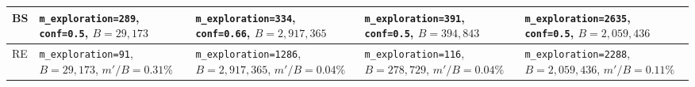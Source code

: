 \begin{table}[ht]
\begin{tabular}{lllll}
\midrule
BS
& \makecell{\texttt{m\_exploration=289}, \\ \texttt{conf=0.5}, \\ {\scriptsize $B=29{,}173$}}
& \makecell{\texttt{m\_exploration=334}, \\ \texttt{conf=0.66}, \\ {\scriptsize $B=2{,}917{,}365$}}
& \makecell{\texttt{m\_exploration=391}, \\ \texttt{conf=0.5}, \\ {\scriptsize $B=394{,}843$}}
& \makecell{\texttt{m\_exploration=2635}, \\ \texttt{conf=0.5}, \\ {\scriptsize $B=2{,}059{,}436$}} \\
\midrule
RE
& \makecell{\texttt{m\_exploration=91}, \\ {\scriptsize $B=29{,}173$}, \\ {\scriptsize $m'/B=0.31\%$}}
& \makecell{\texttt{m\_exploration=1286}, \\ {\scriptsize $B=2{,}917{,}365$}, \\ {\scriptsize $m'/B=0.04\%$}}
& \makecell{\texttt{m\_exploration=116}, \\ {\scriptsize $B=278{,}729$}, \\ {\scriptsize $m'/B=0.04\%$}}
& \makecell{\texttt{m\_exploration=2288}, \\ {\scriptsize $B=2{,}059{,}436$}, \\ {\scriptsize $m'/B=0.11\%$}} \\
\bottomrule
\end{tabular}
\end{table}
